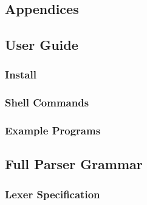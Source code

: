 \documentclass{l4proj}
\begin{document}
\begin{appendices}

\chapter{Appendices}
\label{chp:appendix}

\section{User Guide}
\subsection{Install}
\subsection{Shell Commands}
\subsection{Example Programs}
\section{Full Parser Grammar}
\subsection{Lexer Specification}


\end{appendices}
\end{document}
